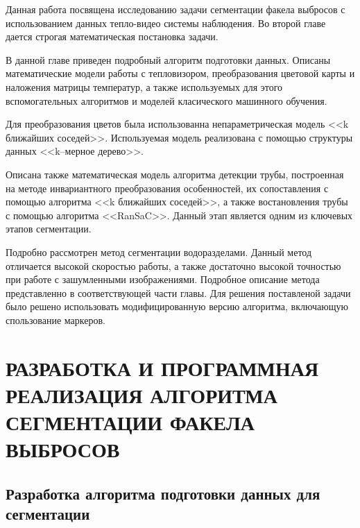 \documentclass[14pt, a4paper]{extreport}
\begin{document}
	Данная работа посвящена исследованию задачи сегментации факела выбросов с использованием данных тепло-видео системы наблюдения. Во второй главе дается строгая математическая постановка задачи.
	
	В данной главе приведен подробный алгоритм подготовки данных. Описаны математические модели работы с тепловизором, преобразования цветовой карты и наложения матрицы температур, а также используемых для этого вспомогательных алгоритмов и моделей класического машинного обучения.
	
	Для преобразования цветов была использованна непараметрическая модель <<k ближайших соседей>>. Используемая модель реализована с помощью структуры данных <<k--мерное дерево>>.
	
	Описана также математическая модель алгоритма детекции трубы, построенная на методе инвариантного преобразования особенностей, их сопоставления с помощью алгоритма <<k ближайших соседей>>, а также востановления трубы с помощью алгоритма <<RanSaC>>. Данный этап является одним из ключевых этапов сегментации.
	
	Подробно рассмотрен метод сегментации водоразделами. Данный метод отличается высокой скоростью работы, а также достаточно высокой точностью при работе с зашумленными изображениями. Подробное описание метода представленно в соответствующей части главы. Для решения поставленой задачи было решено использовать модифицированную версию алгоритма, включающую спользование маркеров.
	
	
\chapter[\vspace*{-0.22cm}РАЗРАБОТКА И ПРОГРАММНАЯ РЕАЛИЗАЦИЯ АЛГОРИТМА \hspace*{-0.5cm} СЕГМЕНТАЦИИ ФАКЕЛА ВЫБРОСОВ]{\vspace*{-0.22cm}РАЗРАБОТКА И ПРОГРАММНАЯ РЕАЛИЗАЦИЯ АЛГОРИТМА СЕГМЕНТАЦИИ ФАКЕЛА ВЫБРОСОВ}
\section[Разработка алгоритма подготовки данных для сегментации]{Разработка алгоритма подготовки данных для сегментации}
	
\end{document}
